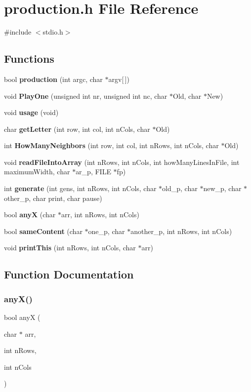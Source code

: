 \section{production.\+h File Reference}
\label{production_8h}
{\ttfamily \#include $<$stdio.\+h$>$}\newline
\subsection*{Functions}
\begin{DoxyCompactItemize}
\item 
bool \textbf{ production} (int argc, char $\ast$argv[$\,$])
\item 
void \textbf{ Play\+One} (unsigned int nr, unsigned int nc, char $\ast$Old, char $\ast$New)
\item 
void \textbf{ usage} (void)
\item 
char \textbf{ get\+Letter} (int row, int col, int n\+Cols, char $\ast$Old)
\item 
int \textbf{ How\+Many\+Neighbors} (int row, int col, int n\+Rows, int n\+Cols, char $\ast$Old)
\item 
void \textbf{ read\+File\+Into\+Array} (int n\+Rows, int n\+Cols, int how\+Many\+Lines\+In\+File, int maximum\+Width, char $\ast$ar\+\_\+p, F\+I\+LE $\ast$fp)
\item 
int \textbf{ generate} (int gens, int n\+Rows, int n\+Cols, char $\ast$old\+\_\+p, char $\ast$new\+\_\+p, char $\ast$other\+\_\+p, char print, char pause)
\item 
bool \textbf{ anyX} (char $\ast$arr, int n\+Rows, int n\+Cols)
\item 
bool \textbf{ same\+Content} (char $\ast$one\+\_\+p, char $\ast$another\+\_\+p, int n\+Rows, int n\+Cols)
\item 
void \textbf{ print\+This} (int n\+Rows, int n\+Cols, char $\ast$arr)
\end{DoxyCompactItemize}


\subsection{Function Documentation}
\mbox{\label{production_8h_a85f4ceb7eddb00ab9989daf800a74d3f}} 
\subsubsection{any\+X()}
{\footnotesize\ttfamily bool anyX (\begin{DoxyParamCaption}\item[{char $\ast$}]{arr,  }\item[{int}]{n\+Rows,  }\item[{int}]{n\+Cols }\end{DoxyParamCaption})}



